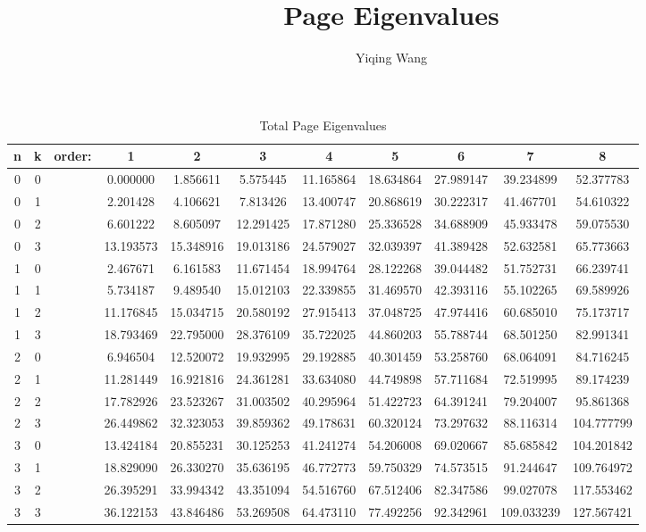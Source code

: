 \documentclass{article}
\title{Page Eigenvalues}
\author{Yiqing Wang}
\begin{document}
\maketitle


\begin{table}[htbp]
\caption{Total Page Eigenvalues}
\label{ }
\begin{tabular}{c|c|c|c|c|c|c|c|c|c|c}
\toprule
n & k & order: & 1 & 2 & 3 & 4 & 5 & 6 & 7 & 8 \\
\midrule
0 & 0 &   & 0.000000 & 1.856611 & 5.575445 & 11.165864 & 18.634864 & 27.989147 & 39.234899 & 52.377783 \\
0 & 1 &   & 2.201428 & 4.106621 & 7.813426 & 13.400747 & 20.868619 & 30.222317 & 41.467701 & 54.610322 \\
0 & 2 &   & 6.601222 & 8.605097 & 12.291425 & 17.871280 & 25.336528 & 34.688909 & 45.933478 & 59.075530 \\
0 & 3 &   & 13.193573 & 15.348916 & 19.013186 & 24.579027 & 32.039397 & 41.389428 & 52.632581 & 65.773663 \\
1 & 0 &   & 2.467671 & 6.161583 & 11.671454 & 18.994764 & 28.122268 & 39.044482 & 51.752731 & 66.239741 \\
1 & 1 &   & 5.734187 & 9.489540 & 15.012103 & 22.339855 & 31.469570 & 42.393116 & 55.102265 & 69.589926 \\
1 & 2 &   & 11.176845 & 15.034715 & 20.580192 & 27.915413 & 37.048725 & 47.974416 & 60.685010 & 75.173717 \\
1 & 3 &   & 18.793469 & 22.795000 & 28.376109 & 35.722025 & 44.860203 & 55.788744 & 68.501250 & 82.991341 \\
2 & 0 &   & 6.946504 & 12.520072 & 19.932995 & 29.192885 & 40.301459 & 53.258760 & 68.064091 & 84.716245 \\
2 & 1 &   & 11.281449 & 16.921816 & 24.361281 & 33.634080 & 44.749898 & 57.711684 & 72.519995 & 89.174239 \\
2 & 2 &   & 17.782926 & 23.523267 & 31.003502 & 40.295964 & 51.422723 & 64.391241 & 79.204007 & 95.861368 \\
2 & 3 &   & 26.449862 & 32.323053 & 39.859362 & 49.178631 & 60.320124 & 73.297632 & 88.116314 & 104.777799 \\
3 & 0 &   & 13.424184 & 20.855231 & 30.125253 & 41.241274 & 54.206008 & 69.020667 & 85.685842 & 104.201842 \\
3 & 1 &   & 18.829090 & 26.330270 & 35.636195 & 46.772773 & 59.750329 & 74.573515 & 91.244647 & 109.764972 \\
3 & 2 &   & 26.395291 & 33.994342 & 43.351094 & 54.516760 & 67.512406 & 82.347586 & 99.027078 & 117.553462 \\
3 & 3 &   & 36.122153 & 43.846486 & 53.269508 & 64.473110 & 77.492256 & 92.342961 & 109.033239 & 127.567421 \\
\bottomrule
\end{tabular}
\end{table}
\end{document}

